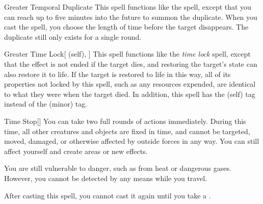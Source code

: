 \lowercase{\hypertarget{spell:Greater Temporal Duplicate}{}}\label{spell:Greater Temporal Duplicate}
\begin{ability}[\nth{7}]{\hypertarget{spell:Greater Temporal Duplicate}{Greater Temporal Duplicate}}
This spell functions like the  spell, except that you can reach up to five minutes into the future to summon the duplicate.
When you cast the spell, you choose the length of time before the target disappears.
The duplicate still only exists for a single round.
\end{ability}
\vspace{0.25em}



\lowercase{\hypertarget{spell:Greater Time Lock}{}}\label{spell:Greater Time Lock}
\begin{ability}[\nth{7}]{\hypertarget{spell:Greater Time Lock}{Greater Time Lock}}[ (self), ]
This spell functions like the \textit{time lock} spell, except that the effect is not ended if the target dies, and restoring the target's state can also restore it to life.
If the target is restored to life in this way, all of its properties not locked by this spell, such as any resources expended, are identical to what they were when the target died.
In addition, this spell has the  (self) tag instead of the  (minor) tag.
\end{ability}
\vspace{0.25em}



\lowercase{\hypertarget{spell:Time Stop}{}}\label{spell:Time Stop}
\begin{ability}[\nth{7}]{\hypertarget{spell:Time Stop}{Time Stop}}[]
You can take two full rounds of actions immediately.
During this time, all other creatures and objects are fixed in time, and cannot be targeted, moved, damaged, or otherwise affected by outside forces in any way.
You can still affect yourself and create areas or new effects.

You are still vulnerable to danger, such as from heat or dangerous gases.
However, you cannot be detected by any means while you travel.

After casting this spell, you cannot cast it again until you take a .
\end{ability}
\vspace{0.25em}



